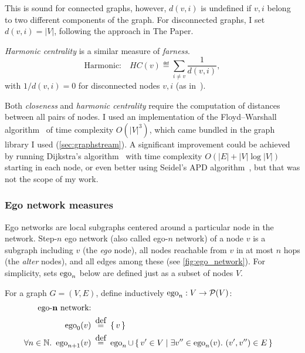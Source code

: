 This is sound for connected graphs, however, $d(v, i)$ is undefined if $v, i$ belong to two different components of the graph.
For disconnected graphs, I set $d(v, i) = \left\lvert V \right\rvert$, following the approach in The Paper.



\textsl{Harmonic centrality} is a similar measure of \textsl{farness}.
\begin{equation}
    \label{eqn:harmonic_centrality}
    \text{Harmonic:}\quad HC(v) \eqdef \sum_{i \neq v} \frac{1}{d(v, i)},
\end{equation}
with $1 / d(v, i) = 0$ for disconnected nodes $v, i$ (as in~\cite{MarchioriHarmonySmallworld2000}).

\begin{wrapfigure}[11]{R}{0.23\linewidth}
    
\end{wrapfigure}

Both \textsl{closeness} and \textsl{harmonic centrality} require the computation of distances between all pairs of nodes.
I used an implementation of the Floyd–Warshall algorithm~\cite{FloydAlgorithm97Shortest1962} of time complexity $O({\left\lvert V \right\rvert}^3)$, which came bundled in the graph library I used (\cref{sec:graphstream}).
A significant improvement could be achieved by running Dijkstra's algorithm~\cite{dijkstra1959note} with time complexity $O(\left\lvert E \right\rvert + \left\lvert V \right\rvert \log \left\lvert V \right\rvert )$ starting in each node, or even better using Seidel's APD algorithm~\cite{SeidelAllPairsShortestPathProblemUnweighted1995}, but that was not the scope of my work.

\subsubsection*{Ego network measures}

Ego networks are local subgraphs centered around a particular node in the network.
Step-$n$ ego network (also called ego-$n$ network) of a node $v$ is a subgraph including $v$ (the \textsl{ego} node), all nodes reachable from $v$ in at most $n$ hops (the \textsl{alter} nodes), and all edges among these (see \autoref{fig:ego_network}).
For simplicity, sets $\operatorname{ego}_n$ below are defined just as a subset of nodes $V$.

For a graph $G = (V, E)$, define inductively $\operatorname{ego}_n : V \rightarrow \mathcal{P}(V)$:
\begin{align}
    \text{ego-$\mathbf{n}$ network:} \nonumber \\
    \ego_0(v) &\eqdef \left\{\, v \, \right\} \\
    \forall n \in \mathbb{N}.\ \ego_{n+1} (v) &\eqdef \ego_n \cup \Set{v' \in V}{ \exists v'' \in \ego_n(v).\ (v', v'') \in E }
\end{align}


